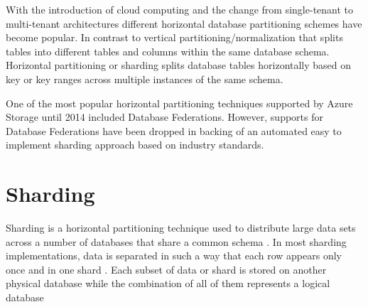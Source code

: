 With the introduction of cloud computing and the change from single-tenant to multi-tenant architectures different horizontal database partitioning schemes have become popular. In contrast to vertical partitioning/normalization that splits tables into different tables and columns within the same database schema. Horizontal partitioning or sharding splits database tables horizontally based on key or key ranges across multiple instances of the same schema.
 
One of the most popular horizontal partitioning techniques supported by Azure Storage until 2014 included Database Federations. However, supports for Database Federations have been dropped in backing of an automated easy to implement sharding approach based on industry standards.

\section{Sharding}

Sharding is a horizontal partitioning technique used to distribute large data sets across a number of databases that share a common schema \cite{Microsoft_Corporation_undated-ej}. In most sharding implementations, data is separated in such a way that each row appears only once and in one shard \cite{Wilder2012-so}. Each subset of data or shard is stored on another physical database while the combination of all of them represents a logical database \cite{Wilder2012-so}
 
